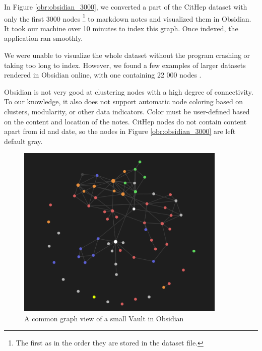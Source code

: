 In Figure \ref{obr:obsidian_3000}, we converted a part of the CitHep dataset with only the first 3000 nodes
\footnote{The first as in the order they are stored in the dataset file.}
to markdown notes and visualized them in Obsidian.
It took our machine over 10 minutes to index this graph.
Once indexed, the application ran smoothly.

We were unable to visualize the whole dataset without the program crashing or taking too long to index.
However, we found a few examples of larger datasets rendered in Obsidian online, with one containing 22 000 nodes
\cite{obsidian_reddit_large_graph}.

Obsidian is not very good at clustering nodes with a high degree of connectivity.
To our knowledge, it also does not support automatic node coloring based on clusters, modularity, or other data indicators.
Color must be user-defined based on the content and location of the notes.
CitHep nodes do not contain content apart from id and date, so the nodes in Figure \ref{obr:obsidian_3000} are left default gray.

\begin{figure}[p]\centering
  \includegraphics[width=100mm, keepaspectratio]{img/obsidian_common_notes.png}
  \caption{A common graph view of a small Vault in Obsidian}
  \label{obr:obsidian_common}
\end{figure}


